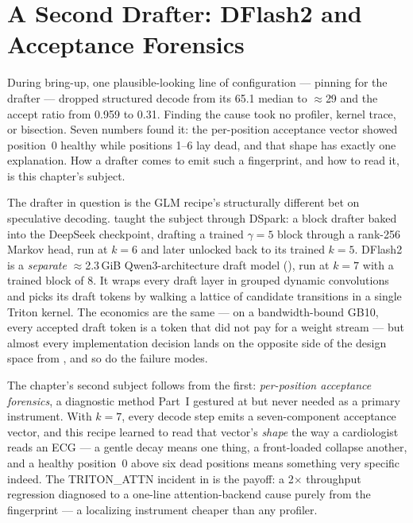 \chapter{A Second Drafter: DFlash2 and Acceptance Forensics}
\label{ch:dflash2}

During bring-up, one plausible-looking line of configuration --- pinning
 for the drafter --- dropped structured
decode from its 65.1 \tokspersec{} median to $\approx$29 and the accept ratio
from 0.959 to 0.31. Finding the cause took no profiler, kernel trace, or bisection.
Seven numbers found it: the per-position acceptance vector showed position~0
healthy while positions 1--6 lay dead, and that shape has exactly one
explanation. How a drafter comes to emit such a fingerprint, and how to read
it, is this chapter's subject.

The drafter in question is the GLM recipe's structurally different bet on
speculative decoding.  taught the subject through
DSpark: a block drafter baked into the DeepSeek checkpoint, drafting a
trained $\gamma{=}5$ block through a rank-256 Markov head, run at $k{=}6$
and later unlocked back to its trained $k{=}5$. DFlash2 is a \emph{separate}
$\approx$2.3\,GiB Qwen3-architecture draft model
(), run at $k{=}7$ with a trained block
of 8. It wraps every draft layer in grouped dynamic convolutions and picks
its draft tokens by walking a lattice of candidate transitions in a single
Triton kernel. The economics are the same --- on a bandwidth-bound GB10,
every accepted draft token is a token that did not pay for a weight stream
--- but almost every implementation decision lands on the opposite side of
the design space from , and so do the failure modes.

The chapter's second subject follows from the first: \emph{per-position
acceptance forensics}, a diagnostic method Part~I gestured at but never
needed as a primary instrument. With $k{=}7$, every decode step emits a
seven-component acceptance vector, and this recipe learned to read that
vector's \emph{shape} the way a cardiologist reads an ECG --- a gentle decay
means one thing, a front-loaded collapse another, and a healthy position~0
above six dead positions means something very specific indeed. The
TRITON\_ATTN incident in  is the payoff: a
2$\times$ throughput regression diagnosed to a one-line attention-backend
cause purely from the fingerprint --- a localizing instrument cheaper than
any profiler.

